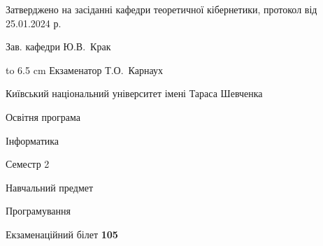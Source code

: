 \documentclass[12pt, ukrainian]{article}
\begin{document}
{\smallskip\smallskip \begin {scriptsize} Затверджено на засіданні кафедри теоретичної кібернетики, протокол   від   25.01.2024 р.\par\smallskip\smallskip\smallskip\smallskip
{\parbox {6.5 cm} {Зав. кафедри \dotfill Ю.В.~Крак}}\hspace {0.7cm} {\hbox to 6.5 cm { Екзаменатор \dotfill Т.О.~Карнаух}} \end{scriptsize}}
\newpage
{{\begin {scriptsize}\par
{ \center  Київський національний університет імені Тараса Шевченка \par}
{\parbox {5 cm}{Освітня програма \hfill}{\parbox {7 cm}{Інформатика\hfill}}\parbox {6 cm}{\hfill Семестр 2}}\par
{\parbox {5 cm} {Навчальний предмет \hfill}\parbox {7 cm}{Програмування \hfill}\parbox {6cm}{\hfill}\par}\vspace{-15pt} \end{scriptsize}}{\center Екзаменаційний білет \No \textbf { 105 }\par}}
\end{document}
